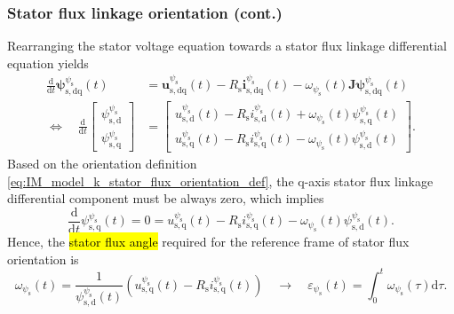 \begin{frame}
    \frametitle{Stator flux linkage orientation (cont.)}
    Rearranging the stator voltage equation towards a stator flux linkage differential equation yields
    \begin{equation}
        \begin{split}
            \frac{\mathrm{d}}{\mathrm{d}t}\bm{\psi}^{\psi_{\mathrm{s}}}_\mathrm{s,dq}(t)                                                               & = \bm{u}^{\psi_{\mathrm{s}}}_\mathrm{s,dq}(t) - R_\mathrm{s} \bm{i}^{\psi_{\mathrm{s}}}_\mathrm{s,dq}(t) - \omega_{\psi_{\mathrm{s}}}(t)\bm{J}\bm{\psi}^{\psi_{\mathrm{s}}}_\mathrm{s,dq}(t)                                                                                                                                                                                          \\ \Leftrightarrow \quad
            \frac{\mathrm{d}}{\mathrm{d}t}\begin{bmatrix} \psi^{\psi_{\mathrm{s}}}_\mathrm{s,d} \\ \psi^{\psi_{\mathrm{s}}}_\mathrm{s,q} \end{bmatrix} & = \begin{bmatrix} u_{\mathrm{s,d}}^{\psi_{\mathrm{s}}}(t) - R_\mathrm{s} i_{\mathrm{s,d}}^{\psi_{\mathrm{s}}}(t) + \omega_{\psi_{\mathrm{s}}}(t)\psi_{\mathrm{s,q}}^{\psi_{\mathrm{s}}}(t) \\ u_{\mathrm{s,q}}^{\psi_{\mathrm{s}}}(t) - R_\mathrm{s} i_{\mathrm{s,q}}^{\psi_{\mathrm{s}}}(t) - \omega_{\psi_{\mathrm{s}}}(t)\psi_{\mathrm{s,d}}^{\psi_{\mathrm{s}}}(t) \end{bmatrix}.
        \end{split}
        \label{eq:IM_model_k_stator_flux_orientation_differential_equation}
    \end{equation}\pause%
    Based on the orientation definition \eqref{eq:IM_model_k_stator_flux_orientation_def}, the $\mathrm{q}$-axis stator flux linkage differential component must be always zero, which implies
    \begin{equation}
        \frac{\mathrm{d}}{\mathrm{d}t}\psi_{\mathrm{s,q}}^{\psi_{\mathrm{s}}}(t) = 0 = u_{\mathrm{s,q}}^{\psi_{\mathrm{s}}}(t) - R_\mathrm{s} i_{\mathrm{s,q}}^{\psi_{\mathrm{s}}}(t) - \omega_{\psi_{\mathrm{s}}}(t)\psi_{\mathrm{s,d}}^{\psi_{\mathrm{s}}}(t).
    \end{equation}\pause%
    Hence, the \hl{stator flux angle} required for the reference frame of stator flux orientation is
    \begin{equation}
        \omega_{\psi_{\mathrm{s}}}(t) = \frac{1}{\psi_{\mathrm{s,d}}^{\psi_{\mathrm{s}}}(t)}\left(u_{\mathrm{s,q}}^{\psi_{\mathrm{s}}}(t) - R_\mathrm{s} i_{\mathrm{s,q}}^{\psi_{\mathrm{s}}}(t)\right) \quad \rightarrow \quad \varepsilon_{\psi_{\mathrm{s}}}(t) = \int_0^t \omega_{\psi_{\mathrm{s}}}(\tau) \mathrm{d}\tau.
        \label{eq:IM_model_k_stator_flux_orientation_angular_velocity}
    \end{equation}
\end{frame}

